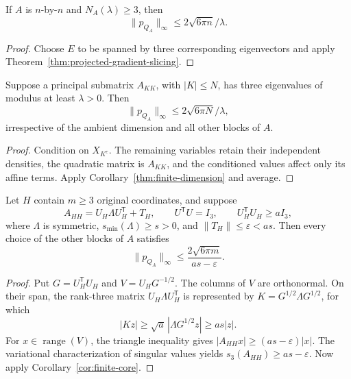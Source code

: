 \begin{corollary}
\label{thm:finite-dimension}
If \(A\) is \(n\)-by-\(n\) and \(N_A(\lambda)\geq3\), then
\[
 \|p_{Q_A}\|_\infty\leq2\sqrt{6\pi n}/\lambda.
\]
\end{corollary}
\begin{proof}
Choose \(E\) to be spanned by three corresponding eigenvectors
and apply Theorem~\ref{thm:projected-gradient-slicing}.
\end{proof}

\begin{corollary}
\label{cor:finite-core}
Suppose a principal submatrix \(A_{KK}\), with \(|K|\leq N\),
has three eigenvalues of modulus at least \(\lambda>0\).
Then
\[
 \|p_{Q_A}\|_\infty\leq2\sqrt{6\pi N}/\lambda,
\]
irrespective of the ambient dimension and all other blocks of \(A\).
\end{corollary}
\begin{proof}
Condition on \(X_{K^c}\).  The remaining variables retain their
independent densities, the quadratic matrix is \(A_{KK}\),
and the conditioned values affect only its affine terms.
Apply Corollary~\ref{thm:finite-dimension} and average.
\end{proof}

\begin{theorem}
\label{thm:physical-core-stability}
Let \(H\) contain \(m\geq3\) original coordinates, and suppose
\[
 A_{HH}=U_H\Lambda U_H^{\mathsf T}+T_H,\qquad
 U^{\mathsf T}U=I_3,\qquad
 U_H^{\mathsf T}U_H\geq aI_3,
\]
where \(\Lambda\) is symmetric,
\(s_{\min}(\Lambda)\geq s>0\), and
\(\|T_H\|\leq\varepsilon<as\).
Then every choice of the other blocks of \(A\) satisfies
\[
 \|p_{Q_A}\|_\infty\leq
 \frac{2\sqrt{6\pi m}}{as-\varepsilon}.
\]
\end{theorem}
\begin{proof}
Put \(G=U_H^{\mathsf T}U_H\) and
\(V=U_HG^{-1/2}\).  The columns of \(V\) are orthonormal.
On their span, the rank-three matrix
\(U_H\Lambda U_H^{\mathsf T}\) is represented by
\(K=G^{1/2}\Lambda G^{1/2}\), for which
\[
 |Kz|\geq\sqrt a\,|\Lambda G^{1/2}z|
 \geq as|z|.
\]
For \(x\in\operatorname{range}(V)\), the triangle inequality
gives \(|A_{HH}x|\geq(as-\varepsilon)|x|\).
The variational characterization of singular values yields
\(s_3(A_{HH})\geq as-\varepsilon\).
Now apply Corollary~\ref{cor:finite-core}.
\end{proof}

